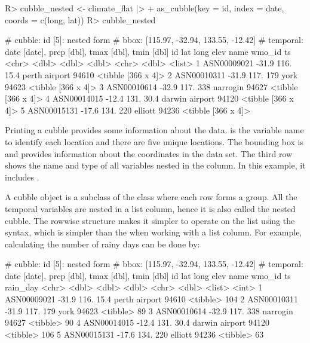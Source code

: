 \documentclass[
]{jss}
\begin{document}
\begin{CodeChunk}
\begin{CodeInput}
R> cubble_nested <- climate_flat |>
+   as_cubble(key = id, index = date, coords = c(long, lat))
R> cubble_nested
\end{CodeInput}
\begin{CodeOutput}
# cubble:   id [5]: nested form
# bbox:     [115.97, -32.94, 133.55, -12.42]
# temporal: date [date], prcp [dbl], tmax [dbl], tmin [dbl]
  id            lat  long  elev name           wmo_id ts                
  <chr>       <dbl> <dbl> <dbl> <chr>           <dbl> <list>            
1 ASN00009021 -31.9  116.  15.4 perth airport   94610 <tibble [366 x 4]>
2 ASN00010311 -31.9  117. 179   york            94623 <tibble [366 x 4]>
3 ASN00010614 -32.9  117. 338   narrogin        94627 <tibble [366 x 4]>
4 ASN00014015 -12.4  131.  30.4 darwin airport  94120 <tibble [366 x 4]>
5 ASN00015131 -17.6  134. 220   elliott         94236 <tibble [366 x 4]>
\end{CodeOutput}
\end{CodeChunk}

Printing a cubble provides some information about the data.  is the variable name to identify each location and there are five unique locations. The bounding box is \code{[115.97, -32.94, 133.55, -12.42]} and provides information about the coordinates in the data set. The third row shows the name and type of all variables nested in the  column. In this example, it includes .

A cubble object is a subclass of the  class where each row forms a group. All the temporal variables are nested in a list column, hence it is also called the nested cubble. The rowwise structure makes it simpler to operate on the list using the  syntax, which is simpler than the  when working with a list column. For example, calculating the number of rainy days can be done by:

\begin{CodeChunk}
\begin{CodeOutput}
# cubble:   id [5]: nested form
# bbox:     [115.97, -32.94, 133.55, -12.42]
# temporal: date [date], prcp [dbl], tmax [dbl], tmin [dbl]
  id            lat  long  elev name           wmo_id ts       rain_day
  <chr>       <dbl> <dbl> <dbl> <chr>           <dbl> <list>      <int>
1 ASN00009021 -31.9  116.  15.4 perth airport   94610 <tibble>      104
2 ASN00010311 -31.9  117. 179   york            94623 <tibble>       89
3 ASN00010614 -32.9  117. 338   narrogin        94627 <tibble>       90
4 ASN00014015 -12.4  131.  30.4 darwin airport  94120 <tibble>      106
5 ASN00015131 -17.6  134. 220   elliott         94236 <tibble>       63
\end{CodeOutput}
\end{CodeChunk}
\end{document}
